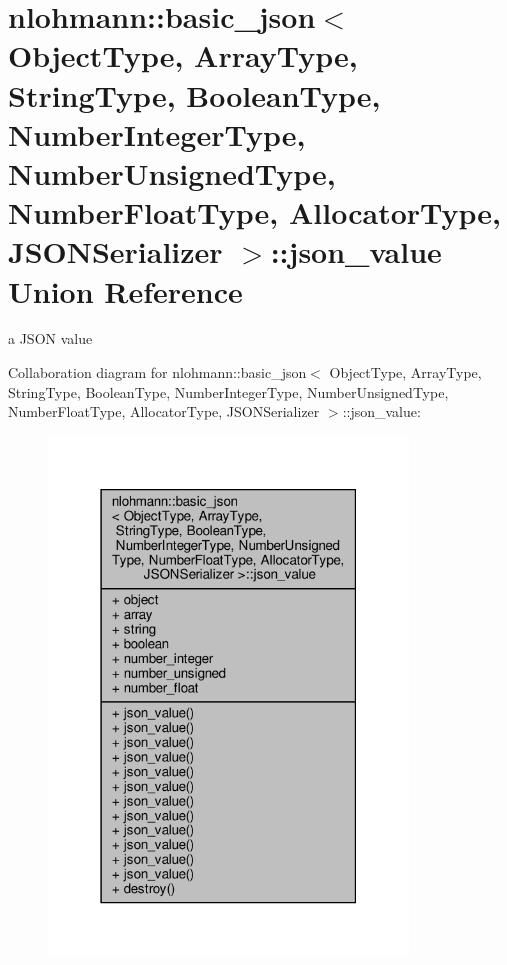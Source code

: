\hypertarget{unionnlohmann_1_1basic__json_1_1json__value}{}\section{nlohmann\+:\+:basic\+\_\+json$<$ Object\+Type, Array\+Type, String\+Type, Boolean\+Type, Number\+Integer\+Type, Number\+Unsigned\+Type, Number\+Float\+Type, Allocator\+Type, J\+S\+O\+N\+Serializer $>$\+:\+:json\+\_\+value Union Reference}
\label{unionnlohmann_1_1basic__json_1_1json__value}


a J\+S\+ON value  




Collaboration diagram for nlohmann\+:\+:basic\+\_\+json$<$ Object\+Type, Array\+Type, String\+Type, Boolean\+Type, Number\+Integer\+Type, Number\+Unsigned\+Type, Number\+Float\+Type, Allocator\+Type, J\+S\+O\+N\+Serializer $>$\+:\+:json\+\_\+value\+:\nopagebreak
\begin{figure}[H]
\begin{center}
\leavevmode
\includegraphics[width=271pt]{unionnlohmann_1_1basic__json_1_1json__value__coll__graph}
\end{center}
\end{figure}
